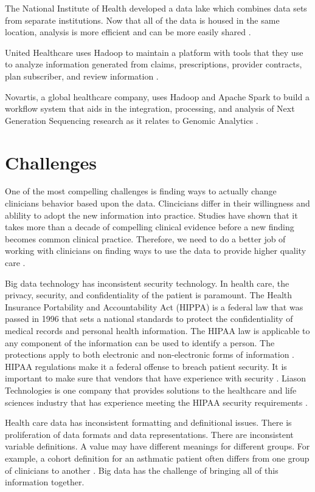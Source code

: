 \documentclass[sigconf]{acmart}
\begin{document}
The National Institute of Health developed a data lake which combines data sets from separate institutions. Now that all of the data is housed in the same location, analysis is more efficient and can be more easily shared \cite{www-google-McDonald}.

United Healthcare uses Hadoop to maintain a platform with tools that they use to analyze information generated from claims, prescriptions, provider contracts, plan subscriber, and review information \cite{www-google-McDonald}.

Novartis, a global healthcare company, uses Hadoop and Apache Spark to build a workflow system that aids in the integration, processing, and analysis of Next Generation Sequencing research as it relates to Genomic Analytics \cite{www-google-McDonald}.


\section{Challenges}
One of the most compelling challenges is finding ways to actually change clinicians behavior based upon the data. Clincicians differ in their willingness and ablility to adopt the new information into practice.  Studies have shown that it takes more than a decade of compelling clinical evidence before a new finding becomes common clinical practice. Therefore, we need to do a better job of working with clinicians on finding ways to use the data to provide higher quality care \cite{www-google-hadoop}. 

Big data technology has inconsistent security technology. In health care, the privacy, security, and confidentiality of the patient is paramount.  The Health Insurance Portability and Accountability Act (HIPPA) is a federal law that was passed in 1996 that sets a national standards to protect the confidentiality of medical records and personal health information. The HIPAA law is applicable to any component of the information can be used to identify a person. The protections apply to both electronic and non-electronic forms of information \cite{HIPAA}. HIPAA regulations make it a federal offense to breach patient security. It is important to make sure that vendors that have experience with security \cite{www-google-HlthCat}. Liason Technologies is one company that provides solutions to the healthcare and life sciences industry that has experience meeting the HIPAA security requirements \cite{www-google-McDonald}.
 
Health care data has inconsistent formatting and definitional issues. There is proliferation of data formats and data representations. There are inconsistent variable definitions. A value may have different meanings for different groups. For example, a cohort definition for an asthmatic patient often differs from one group of clinicians to another \cite{www-google-reas}. Big data has the challenge of bringing all of this information together.  
\end{document}
